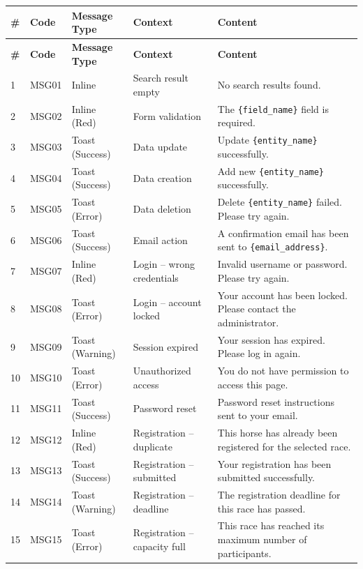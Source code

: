 \renewcommand{\arraystretch}{1.25}
\begin{longtable}{|p{}|p{}|p{}|p{}|p{}|}

\hline
\rowcolor{HeaderPink}
	\textbf{\#} & \textbf{Code} & \textbf{Message Type} & \textbf{Context} & \textbf{Content} \\
\hline
\endfirsthead
\hline
\rowcolor{HeaderPink}
	\textbf{\#} & \textbf{Code} & \textbf{Message Type} & \textbf{Context} & \textbf{Content} \\
\hline
\endhead
\hline
\endfoot
\hline
\endlastfoot

1 & MSG01 & Inline & Search result empty & No search results found. \\
\hline
2 & MSG02 & Inline (Red) & Form validation & The \texttt{\{field\_name\}} field is required. \\
\hline
3 & MSG03 & Toast (Success) & Data update & Update \texttt{\{entity\_name\}} successfully. \\
\hline
4 & MSG04 & Toast (Success) & Data creation & Add new \texttt{\{entity\_name\}} successfully. \\
\hline
5 & MSG05 & Toast (Error) & Data deletion & Delete \texttt{\{entity\_name\}} failed. Please try again. \\
\hline
6 & MSG06 & Toast (Success) & Email action & A confirmation email has been sent to \texttt{\{email\_address\}}. \\
\hline

7 & MSG07 & Inline (Red) & Login -- wrong credentials & Invalid username or password. Please try again. \\
\hline
8 & MSG08 & Toast (Error) & Login -- account locked & Your account has been locked. Please contact the administrator. \\
\hline
9 & MSG09 & Toast (Warning) & Session expired & Your session has expired. Please log in again. \\
\hline
10 & MSG10 & Toast (Error) & Unauthorized access & You do not have permission to access this page. \\
\hline
11 & MSG11 & Toast (Success) & Password reset & Password reset instructions sent to your email. \\
\hline

12 & MSG12 & Inline (Red) & Registration -- duplicate & This horse has already been registered for the selected race. \\
\hline
13 & MSG13 & Toast (Success) & Registration -- submitted & Your registration has been submitted successfully. \\
\hline
14 & MSG14 & Toast (Warning) & Registration -- deadline & The registration deadline for this race has passed. \\
\hline
15 & MSG15 & Toast (Error) & Registration -- capacity full & This race has reached its maximum number of participants. \\
\hline


\end{longtable}
